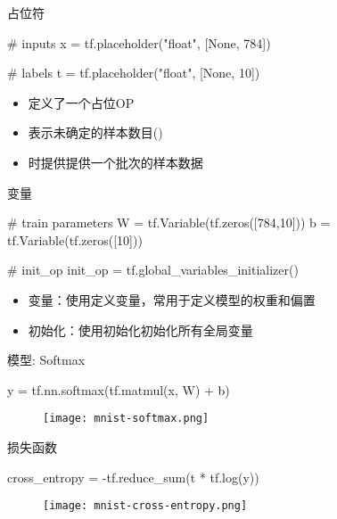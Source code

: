 \begin{frame}[fragile]{占位符}
\begin{python}
# inputs
x  = tf.placeholder("float", [None, 784])  

# labels
t = tf.placeholder("float", [None, 10])
\end{python}

\begin{itemize}
  \item {}定义了一个占位OP
  \item {}表示未确定的样本数目()
  \item {}时提供提供一个批次的样本数据
\end{itemize}
\end{frame}

\begin{frame}[fragile]{变量}
\begin{python}
# train parameters
W = tf.Variable(tf.zeros([784,10]))
b = tf.Variable(tf.zeros([10]))

# init\_op
init_op = tf.global_variables_initializer()
\end{python}

\begin{itemize}
  \item \alert{变量}：使用定义变量，常用于定义模型的权重和偏置
  \item \alert{初始化}：使用初始化初始化所有全局变量 
\end{itemize}
\end{frame}

\begin{frame}[fragile]{模型: Softmax}
  \begin{python}
y = tf.nn.softmax(tf.matmul(x, W) + b)
  \end{python}

  \begin{figure}
    \centering
    \texttt{[image: mnist-softmax.png]}
  \end{figure}
\end{frame}

\begin{frame}[fragile]{损失函数}
  \begin{python}
cross_entropy = -tf.reduce_sum(t * tf.log(y))
  \end{python}

  \begin{figure}
    \centering
    \texttt{[image: mnist-cross-entropy.png]}
  \end{figure}
\end{frame}

